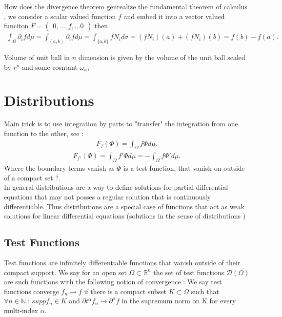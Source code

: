 \begin{example}
 How does the divergence theorem genrealize the fundamental theorem of calculus , 
 we consider a scalar valued function $f$ and embed it into a vector valued funciton $F = \begin{pmatrix} 0 , \ldots  , f , \ldots  0 \end{pmatrix} $ 
 then 
 \begin{align*}
   \int_{\Omega } \partial_i f d\mu  = \int_{(a,b)} \partial_i f  d\mu  = \int_{\{a,b\}  }f N_i d\sigma  = (fN_i)(a) + (fN_i)(b) = f(b)-f(a)
 .\end{align*}
\end{example}
\begin{example}
  Volume of unit ball in $n$ dimension is given by the volume of the unit ball scaled by $r^{n} $ and some cosntant $\omega_n$, 
\end{example}

\section{Distributions} %
\label{sec:Distributions}
Main trick is to use integration by parts to "transfer" the integration from one function to the other, see : 
\begin{align*}
  F_f(\Phi) =  \int_\Omega f \Phi d\mu 
.\end{align*} 
\begin{align*}
  F_{f'}(\Phi) = \int_\Omega f' \Phi  d\mu  = -\int_\Omega f \Phi' d\mu  
.\end{align*}
Where the boundary terms vanish as $\Phi $ is a test function, that vanish on outside of a compact set ?.\\[1ex]
In general distributions are a way to define solutions for partial differential equations 
that may not posses a regular solution that is continuously differentiable. Thus distributions are a special case of functions 
that act as weak solutions for linear differential equations  (solutions in the sense of distributions )
\subsection{Test Functions} %
\label{sub:Test Functions}
Test functions are infinitely differentiable functions that vanish outside of their compact support.
We say for an open set $\Omega  \subset \mathbb{R}^{n } $ the set of test functions $\mathcal{D}(\Omega )$ are such functions with the following 
notion of convergence : 
We say test functions converge $f_n \to f $ if there is a compact subset $K \subset  \Omega $ such that $\forall n \in  \mathbb{N} \ : \ supp f_n \in K$ and 
$\partial t ^{\alpha }f_n \to \partial ^{\alpha } f $ in the supremum norm on K for every multi-index $\alpha $.
